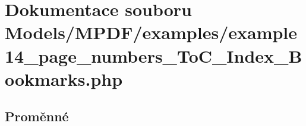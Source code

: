 \hypertarget{example14__page__numbers___to_c___index___bookmarks_8php}{\section{Dokumentace souboru Models/\-M\-P\-D\-F/examples/example14\-\_\-page\-\_\-numbers\-\_\-\-To\-C\-\_\-\-Index\-\_\-\-Bookmarks.php}
\label{example14__page__numbers___to_c___index___bookmarks_8php}
}
\subsection*{Proměnné}
\begin{DoxyCompactItemize}
\item 

\end{DoxyCompactItemize}
